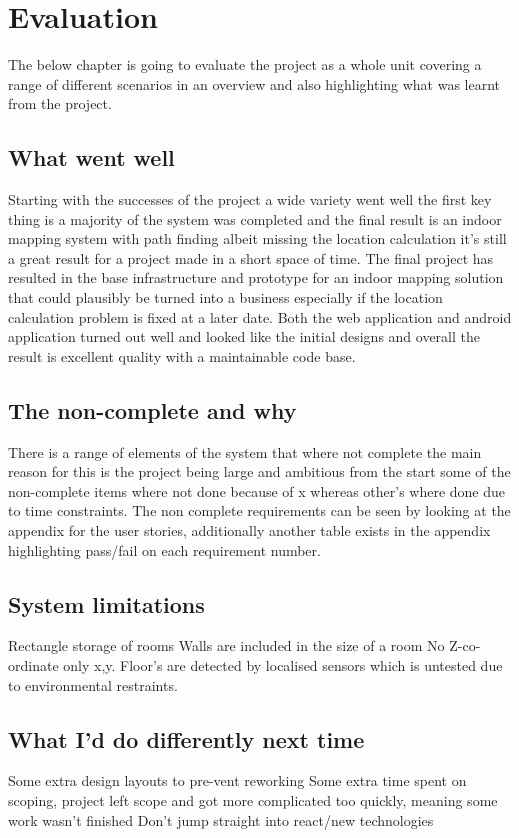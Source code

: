 \section{Evaluation}
The below chapter is going to evaluate the project as a whole unit covering a range of different scenarios in an overview and also highlighting what was learnt from the project.

\subsection{What went well} %
Starting with the successes of the project a wide variety went well the first key thing is a majority of the system was completed and the final result is an indoor mapping system with path finding albeit missing the location calculation it's still a great result for a project made in a short space of time. The final project has resulted in the base infrastructure and prototype for an indoor mapping solution that could plausibly be turned into a business especially if the location calculation problem is fixed at a later date. Both the web application and android application turned out well and looked like the initial designs and overall the result is excellent quality with a maintainable code base.

\subsection{The non-complete and why}
There is a range of elements of the system that where not complete the main reason for this is the project being large and ambitious from the start some of the non-complete items where not done because of x whereas other's where done due to time constraints. The non complete requirements can be seen by looking at the appendix for the user stories, additionally another table exists in the appendix highlighting pass/fail on each requirement number.

\subsection{System limitations} 
Rectangle storage of rooms
Walls are included in the size of a room
No Z-co-ordinate only x,y. Floor's are detected by localised sensors which is untested due to environmental restraints.

\subsection{What I'd do differently next time}
Some extra design layouts to pre-vent reworking
Some extra time spent on scoping, project left scope and got more complicated too quickly, meaning some work wasn't finished
Don't jump straight into react/new technologies

